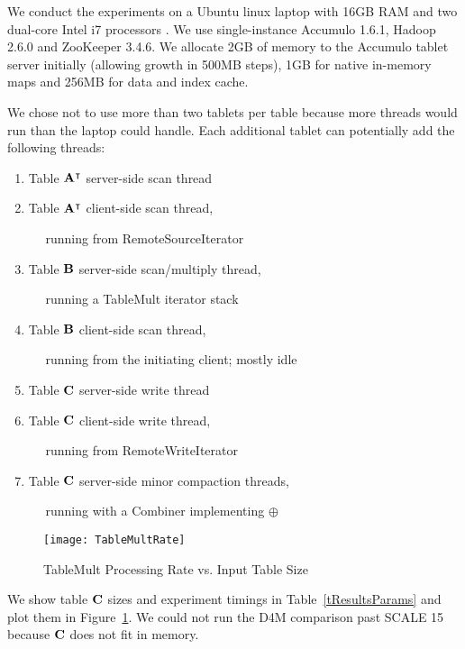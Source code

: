 We conduct the experiments on a Ubuntu linux laptop with 16GB RAM and two dual-core Intel i7 processors%
. We use single-instance Accumulo 1.6.1, Hadoop 2.6.0 and ZooKeeper 3.4.6.
We allocate 2GB of memory to the Accumulo tablet server initially
(allowing growth in 500MB steps),
1GB for native in-memory maps and 256MB for data and index cache.


We chose not to use more than two tablets per table because more threads would run
than the laptop could handle.  Each additional tablet can potentially add the following threads:
\begin{enumerate}
\item Table $\mathbf{A}^{\intercal}$ server-side scan thread
\item Table $\mathbf{A}^{\intercal}$ client-side scan thread,

$\quad$ running from RemoteSourceIterator
\item Table $\mathbf{B}$ server-side scan/multiply thread,

$\quad$ running a TableMult iterator stack
\item Table $\mathbf{B}$ client-side scan thread, 

$\quad$ running from the initiating client; mostly idle
\item Table $\mathbf{C}$ server-side write thread
\item Table $\mathbf{C}$ client-side write thread,

$\quad$ running from RemoteWriteIterator
\item Table $\mathbf{C}$ server-side minor compaction threads,

$\quad$ running with a Combiner implementing $\oplus$
\end{enumerate}

\begin{figure}[tbh]
\centering
\texttt{[image: TableMultRate]}
\caption{TableMult Processing Rate vs. Input Table Size}
\label{fTableMultPerf}
\vspace{-4pt}
\end{figure}

We show table $\mathbf{C}$ sizes and experiment timings in Table~\ref{tResultsParams}
and plot them in Figure~\ref{fTableMultPerf}.
We could not run the D4M comparison past SCALE 15 because $\mathbf{C}$ does not fit in memory.

